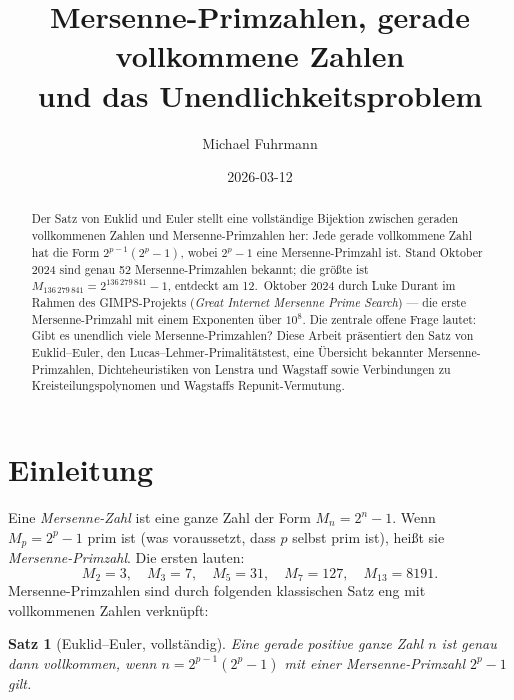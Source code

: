 \documentclass[12pt,a4paper]{amsart}
\newtheorem{satz}[theorem]{Satz}
\theoremstyle{definition}
\theoremstyle{remark}
\begin{document}
\title{Mersenne-Primzahlen, gerade vollkommene Zahlen\\
und das Unendlichkeitsproblem}

\author{Michael Fuhrmann}
\address{Specialist Mathematics Project, Build 168}
\date{2026-03-12}

\begin{abstract}
Der Satz von Euklid und Euler stellt eine vollständige Bijektion zwischen
geraden vollkommenen Zahlen und Mersenne-Primzahlen her: Jede gerade vollkommene
Zahl hat die Form $2^{p-1}(2^p - 1)$, wobei $2^p - 1$ eine Mersenne-Primzahl ist.
Stand Oktober 2024 sind genau 52 Mersenne-Primzahlen bekannt; die größte ist
$M_{136\,279\,841} = 2^{136\,279\,841} - 1$, entdeckt am 12.\ Oktober 2024
durch Luke Durant im Rahmen des GIMPS-Projekts (\textit{Great Internet Mersenne Prime Search})
— die erste Mersenne-Primzahl mit einem Exponenten über $10^8$.
Die zentrale offene Frage lautet: Gibt es unendlich viele Mersenne-Primzahlen?
Diese Arbeit präsentiert den Satz von Euklid--Euler, den Lucas--Lehmer-Primalitätstest,
eine Übersicht bekannter Mersenne-Primzahlen, Dichteheuristiken von Lenstra und
Wagstaff sowie Verbindungen zu Kreisteilungspolynomen und Wagstaffs Repunit-Vermutung.
\end{abstract}

\maketitle

\tableofcontents

\section{Einleitung}

Eine \emph{Mersenne-Zahl} ist eine ganze Zahl der Form $M_n = 2^n - 1$.
Wenn $M_p = 2^p - 1$ prim ist (was voraussetzt, dass $p$ selbst prim ist),
heißt sie \emph{Mersenne-Primzahl}.
Die ersten lauten:
\[
  M_2 = 3, \quad M_3 = 7, \quad M_5 = 31, \quad M_7 = 127, \quad
  M_{13} = 8191.
\]
Mersenne-Primzahlen sind durch folgenden klassischen Satz eng mit
vollkommenen Zahlen verknüpft:

\begin{satz}[Euklid--Euler, vollständig]
\label{satz:ee}
Eine gerade positive ganze Zahl $n$ ist genau dann vollkommen, wenn
$n = 2^{p-1}(2^p - 1)$ mit einer Mersenne-Primzahl $2^p - 1$ gilt.
\end{satz}
\end{document}
